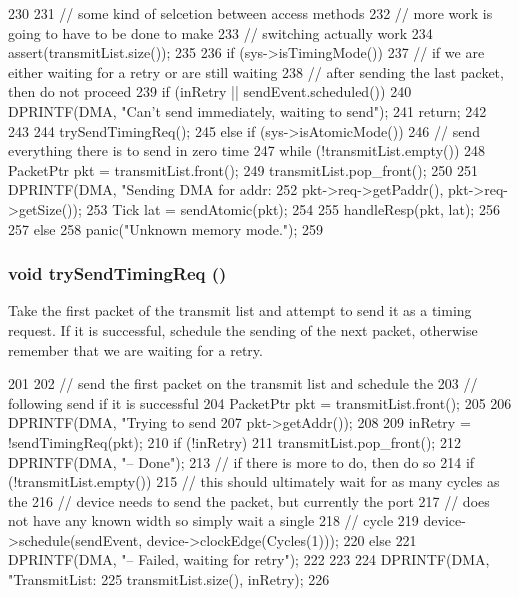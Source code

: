 \begin{DoxyCode}
230 {
231     // some kind of selcetion between access methods
232     // more work is going to have to be done to make
233     // switching actually work
234     assert(transmitList.size());
235 
236     if (sys->isTimingMode()) {
237         // if we are either waiting for a retry or are still waiting
238         // after sending the last packet, then do not proceed
239         if (inRetry || sendEvent.scheduled()) {
240             DPRINTF(DMA, "Can't send immediately, waiting to send\n");
241             return;
242         }
243 
244         trySendTimingReq();
245     } else if (sys->isAtomicMode()) {
246         // send everything there is to send in zero time
247         while (!transmitList.empty()) {
248             PacketPtr pkt = transmitList.front();
249             transmitList.pop_front();
250 
251             DPRINTF(DMA, "Sending  DMA for addr: %
252                     pkt->req->getPaddr(), pkt->req->getSize());
253             Tick lat = sendAtomic(pkt);
254 
255             handleResp(pkt, lat);
256         }
257     } else
258         panic("Unknown memory mode.");
259 }
\end{DoxyCode}
\hypertarget{classDmaPort_ab4a48e8fe7bec0588669bb654736c5e8}{
\subsubsection[{trySendTimingReq}]{\setlength{\rightskip}{0pt plus 5cm}void trySendTimingReq ()}}
\label{classDmaPort_ab4a48e8fe7bec0588669bb654736c5e8}
Take the first packet of the transmit list and attempt to send it as a timing request. If it is successful, schedule the sending of the next packet, otherwise remember that we are waiting for a retry. 


\begin{DoxyCode}
201 {
202     // send the first packet on the transmit list and schedule the
203     // following send if it is successful
204     PacketPtr pkt = transmitList.front();
205 
206     DPRINTF(DMA, "Trying to send %
207             pkt->getAddr());
208 
209     inRetry = !sendTimingReq(pkt);
210     if (!inRetry) {
211         transmitList.pop_front();
212         DPRINTF(DMA, "-- Done\n");
213         // if there is more to do, then do so
214         if (!transmitList.empty())
215             // this should ultimately wait for as many cycles as the
216             // device needs to send the packet, but currently the port
217             // does not have any known width so simply wait a single
218             // cycle
219             device->schedule(sendEvent, device->clockEdge(Cycles(1)));
220     } else {
221         DPRINTF(DMA, "-- Failed, waiting for retry\n");
222     }
223 
224     DPRINTF(DMA, "TransmitList: %
225             transmitList.size(), inRetry);
226 }
\end{DoxyCode}


